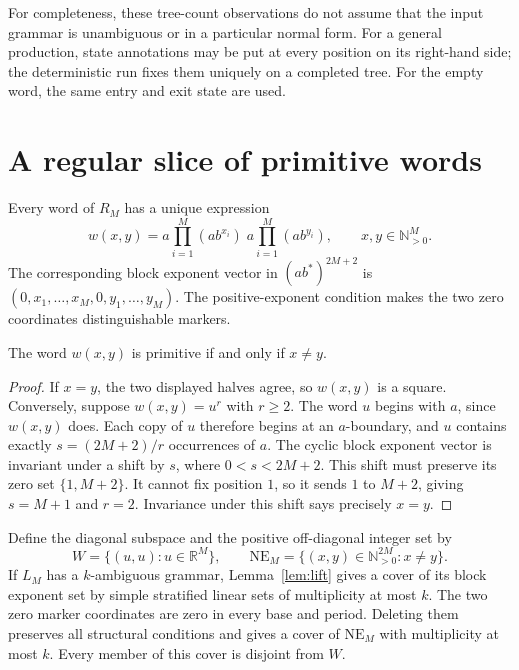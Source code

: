 \documentclass[a4paper,USenglish,cleveref,autoref]{lipics-v2021}
\newcommand{\N}{\mathbb N}
\newcommand{\R}{\mathbb R}
\newcommand{\NE}{\mathrm{NE}}
\begin{document}
For completeness, these tree-count observations do not assume that the input grammar is unambiguous or in a particular normal form.
For a general production, state annotations may be put at every position on its right-hand side; the deterministic run fixes them uniquely on a completed tree.
For the empty word, the same entry and exit state are used.

\section{A regular slice of primitive words}
Every word of $R_M$ has a unique expression
\begin{equation}\label{eq:word}
 w(x,y)=a\prod_{i=1}^M(ab^{x_i})\;a\prod_{i=1}^M(ab^{y_i}),
 \qquad x,y\in\N_{>0}^M.
\end{equation}
The corresponding block exponent vector in $(ab^*)^{2M+2}$ is $(0,x_1,\ldots,x_M,0,y_1,\ldots,y_M)$.
The positive-exponent condition makes the two zero coordinates distinguishable markers.

\begin{lemma}\label{lem:slice}
The word $w(x,y)$ is primitive if and only if $x\ne y$.
\end{lemma}
\begin{proof}
If $x=y$, the two displayed halves agree, so $w(x,y)$ is a square.
Conversely, suppose $w(x,y)=u^r$ with $r\geq2$.
The word $u$ begins with $a$, since $w(x,y)$ does.
Each copy of $u$ therefore begins at an $a$-boundary, and $u$ contains exactly $s=(2M+2)/r$ occurrences of $a$.
The cyclic block exponent vector is invariant under a shift by $s$, where $0<s<2M+2$.
This shift must preserve its zero set $\{1,M+2\}$.
It cannot fix position $1$, so it sends $1$ to $M+2$, giving $s=M+1$ and $r=2$.
Invariance under this shift says precisely $x=y$.
\end{proof}

Define the diagonal subspace and the positive off-diagonal integer set by
\begin{equation}\label{eq:diagonal}
 W=\{(u,u):u\in\R^M\},\qquad
 \NE_M=\{(x,y)\in\N_{>0}^{2M}:x\ne y\}.
\end{equation}
If $L_M$ has a $k$-ambiguous grammar, Lemma~\ref{lem:lift} gives a cover of its block exponent set by simple stratified linear sets of multiplicity at most $k$.
The two zero marker coordinates are zero in every base and period.
Deleting them preserves all structural conditions and gives a cover of $\NE_M$ with multiplicity at most $k$.
Every member of this cover is disjoint from $W$.
\end{document}
